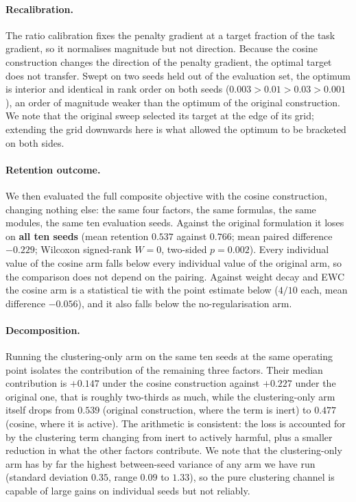 \documentclass[11pt,a4paper]{article}
\begin{document}
\paragraph{Recalibration.} The ratio calibration fixes the penalty gradient at
a target fraction of the task gradient, so it normalises magnitude but not
direction. Because the cosine construction changes the direction of the
penalty gradient, the optimal target does not transfer. Swept on two seeds
held out of the evaluation set, the optimum is interior and identical in rank
order on both seeds ($0.003 > 0.01 > 0.03 > 0.001$), an order of magnitude
weaker than the optimum of the original construction. We note that the
original sweep selected its target at the edge of its grid; extending the grid
downwards here is what allowed the optimum to be bracketed on both sides.

\paragraph{Retention outcome.} We then evaluated the full composite objective
with the cosine construction, changing nothing else: the same four factors,
the same formulas, the same modules, the same ten evaluation seeds. Against
the original formulation it loses on \textbf{all ten seeds} (mean retention
$0.537$ against $0.766$; mean paired difference $-0.229$; Wilcoxon signed-rank
$W=0$, two-sided $p=0.002$). Every individual value of the cosine arm falls
below every individual value of the original arm, so the comparison does not
depend on the pairing. Against weight decay and EWC the cosine arm is a
statistical tie with the point estimate below ($4/10$ each, mean difference
$-0.056$), and it also falls below the no-regularisation arm.

\paragraph{Decomposition.} Running the clustering-only arm on the same ten
seeds at the same operating point isolates the contribution of the remaining
three factors. Their median contribution is $+0.147$ under the cosine
construction against $+0.227$ under the original one, that is roughly
two-thirds as much, while the clustering-only arm itself drops from $0.539$
(original construction, where the term is inert) to $0.477$ (cosine, where it
is active). The arithmetic is consistent: the loss is accounted for by the
clustering term changing from inert to actively harmful, plus a smaller
reduction in what the other factors contribute. We note that the
clustering-only arm has by far the highest between-seed variance of any arm we
have run (standard deviation $0.35$, range $0.09$ to $1.33$), so the pure
clustering channel is capable of large gains on individual seeds but not
reliably.
\end{document}
